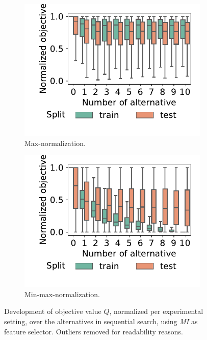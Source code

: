 \documentclass{article}
\theoremstyle{definition}
\begin{document}
\begin{figure}[htb]
	\centering
	\begin{subfigure}{0.48\textwidth}
		\centering
		\includegraphics[width=\textwidth]{plots/impact-num-alternatives-objective-max.pdf}
		\caption{Max-normalization.}
		\label{fig:impact-num-alternatives-objective-max}
	\end{subfigure}
	\hfill
	\begin{subfigure}{0.48\textwidth}
		\centering
		\includegraphics[width=\textwidth]{plots/impact-num-alternatives-objective-min-max.pdf}
		\caption{Min-max-normalization.}
		\label{fig:impact-num-alternatives-objective-min-max}
	\end{subfigure}
	\caption{Development of objective value $Q$, normalized per experimental setting, over the alternatives in sequential search, using \emph{MI} as feature selector.
	Outliers removed for readability reasons.}
	\label{fig:impact-num-alternatives-objective}
\end{figure}
\end{document}
